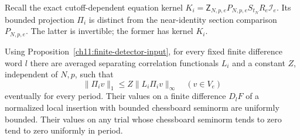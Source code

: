 Recall the exact cutoff-dependent equation kernel
$K_i=\mathsf Z_{N,p,e}P_{N,p,e}S_{t_N}R_e\mathcal I_e$.
Its bounded projection $\Pi_i$ is distinct from the near-identity
section comparison $P_{N,p,e}$. The latter is invertible; the
former has kernel $K_i$.

\begin{proposition}
\label{ch11:uniform-detector}
Using Proposition~\ref{ch11:finite-detector-input}, for every fixed
finite difference word $l$ there are averaged separating correlation functionals $L_i$ and
a constant $Z$, independent of $N,p$, such that
\[
 \|\Pi_i v\|_1\le Z\|L_i\Pi_i v\|_\infty
 \quad(v\in V_e)
\]
eventually for every period. Their values on a finite difference
$D_lF$ of a normalized local insertion with bounded chessboard seminorm are uniformly bounded.
Their values on any trial whose chessboard seminorm tends to zero tend to
zero uniformly in period.
\end{proposition}
